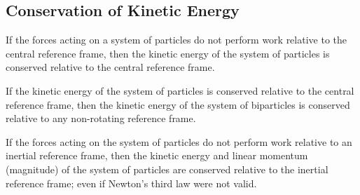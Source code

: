 \documentclass[10pt]{article}
\begin{document}
{\centering\subsection*{Conservation of Kinetic Energy}}

\par If the forces acting on a system of particles do not perform work relative to the central reference frame, then the kinetic energy of the system of particles is conserved relative to the central reference frame.
\smallskip
\par If the kinetic energy of the system of particles is conserved relative to the central reference frame, then the kinetic energy of the system of biparticles is conserved relative to any non-rotating reference frame.
\smallskip
\par If the forces acting on the system of particles do not perform work relative to an inertial reference frame, then the kinetic energy and linear momentum (magnitude) of the system of particles are conserved relative to the inertial reference frame; even if Newton's third law were not valid.
\end{document}
